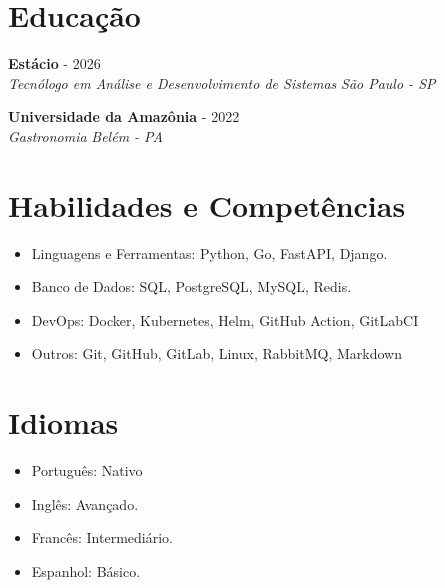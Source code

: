 \documentclass[a4paper,10pt]{article}
\newcommand{\entry}[4]{
  \noindent\textbf{#1} \hfill #2 \\
  \noindent\textit{#3} \hfill \textit{#4} \\
  \vspace{2pt}
}
\begin{document}

\section*{Educação}
\vspace{0.6em}

\entry{Estácio}{\faCalendar {} - 2026}{Tecnólogo em Análise e Desenvolvimento de Sistemas}{\faMapMarker \space São Paulo - SP}

\entry{Universidade da Amazônia}{\faCalendar {} - 2022}{Gastronomia}{\faMapMarker \space Belém - PA}


\section*{Habilidades e Competências}
\vspace{0.6em}
\begin{itemize}
\setlength\itemsep{0em}
\item Linguagens e Ferramentas: Python, Go, FastAPI, Django.
\item Banco de Dados: SQL, PostgreSQL, MySQL, Redis.
\item DevOps: Docker, Kubernetes, Helm, GitHub Action, GitLabCI
\item Outros: Git, GitHub, GitLab, Linux, RabbitMQ, Markdown

\end{itemize}


\section*{Idiomas}
\vspace{0.6em}
\begin{itemize}
\setlength\itemsep{0em}
\item Português: Nativo
\item Inglês: Avançado.
\item Francês: Intermediário.
\item Espanhol: Básico.



\end{itemize}
\end{document}
